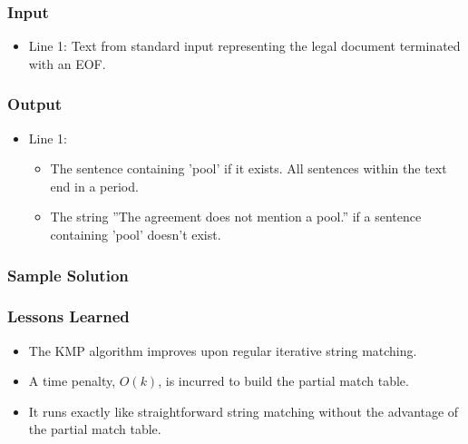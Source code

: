 \subsubsection{Input}
\begin{itemize}
	\item Line 1: Text from standard input representing the legal document terminated with an EOF.
\end{itemize}


\subsubsection{Output}
\begin{itemize}
	\item Line 1:
	\begin{itemize}
		\item The sentence containing 'pool' if it exists. All sentences within the text end in a period.
		\item The string ''The agreement does not mention a pool.'' if a sentence containing 'pool' doesn't exist.
	\end{itemize}
\end{itemize}


\subsubsection{Sample Solution}


\subsubsection{Lessons Learned}
\begin{itemize}
	\item The KMP algorithm improves upon regular iterative string matching.
	\item A time penalty, $O(k)$, is incurred to build the partial match table.
	\item It runs exactly like straightforward string matching without the advantage of the partial match table.
\end{itemize}


